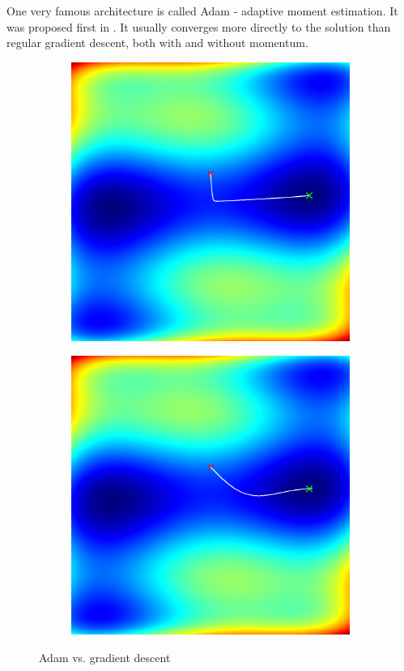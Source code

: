 \documentclass[sigconf,nonacm]{acmart}
\begin{document}
One very famous architecture is called Adam - adaptive moment estimation.
It was proposed first in \cite{kingma2014adam}.
It usually converges more directly to the solution than
regular gradient descent, both with and without momentum.

\begin{figure}[ht]
\begin{subfigure}[c]{0.45\columnwidth}
\includegraphics[width=\textwidth]{sgd-camel-nomomentum.png}
\end{subfigure}
\begin{subfigure}[c]{0.45\columnwidth}
\includegraphics[width=\textwidth]{adam-camel.png}
\end{subfigure}
\caption{Adam vs. gradient descent}
\label{p1:momentum}
\end{figure}
\end{document}
